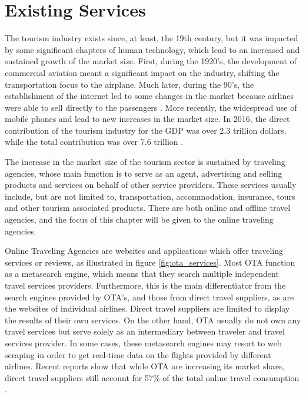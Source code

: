 \section{Existing Services}

The tourism industry exists since, at least, the 19th century,
but it was impacted by some significant chapters of human technology,
which lead to an increased and sustained growth of the market size.
First, during the 1920's, the development of commercial aviation 
meant a significant impact on the industry,
shifting the transportation focus to the airplane.
Much later, during the 90's, the establishment of the internet led to 
some changes in the market 
because airlines were able to sell directly to the passengers \cite{tourism_tec}.
More recently, the widespread use of mobile phones and lead to new increases in the market size.
In 2016, the direct contribution of the tourism industry for the GDP was over 2.3 trillion dollars,
while the total contribution was over 7.6 trillion \cite{travel_report}.

The increase in the market size of the tourism sector 
is sustained by traveling agencies,
whose main function is to serve as an agent, 
advertising and selling products and services on behalf of other service providers.
These services usually include, but are not limited to, transportation,
accommodation, insurance, tours and other tourism associated products.
There are both online and offline travel agencies,
and the focus of this chapter will be given to the online traveling agencies.

Online Traveling Agencies are websites and applications which offer traveling services or reviews,
as illustrated in figure \ref{fig:ota_services}.
Most OTA function as a metasearch engine, 
which means that they search multiple independent travel services providers.
Furthermore, this is the main differentiator from the search engines provided by OTA's, and 
those from direct travel suppliers, as are the websites of individual airlines.
Direct travel suppliers are limited to display the results of their own services. On the other hand, OTA usually do not own any travel services but serve solely as
an intermediary between traveler and travel services provider.
In some cases, these metasearch engines may resort to web scraping
in order to get real-time data on the flights provided by different airlines.
Recent reports show that while OTA are increasing its market share, direct travel suppliers still account 
for 57\% of the total online travel consumption \cite{OTA_industry_report}.


